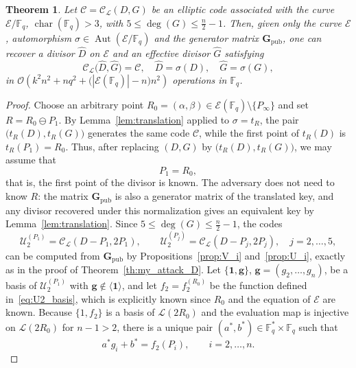 \documentclass[sn-mathphys-num]{sn-jnl_modified}
\newcommand{\FF}{\ensuremath{\mathbb{F}}}
\newtheorem{theorem}{Theorem}[subsection]
\begin{document}
\begin{theorem}\label{th:my_attack_no_hints}
Let $\mathcal{C} = \mathcal{C}_\mathscr{L}(D, G)$ be an elliptic code associated with the curve $\mathcal{E}/\FF_q$, $\operatorname{char}(\FF_q) > 3$, with $5 \leq \deg(G) \leq \frac{n}{2}-1$. Then, given only the curve $\mathcal{E}$, automorphism $\sigma \in \operatorname{Aut}(\mathcal{E}/\FF_q)$ and the generator matrix $\mathbf{G}_{\operatorname{pub}}$, one can recover a divisor $\widehat{D}$ on $\mathcal{E}$ and an effective divisor $\widehat{G}$ satisfying
\[
\mathcal{C}_\mathscr{L}\bigl(\widehat{D}, \widehat{G}\bigr) = \mathcal{C}, \quad
\widehat{D} = \sigma(D), \quad \widehat{G} = \sigma(G),
\]
in $\mathcal{O}\!\left(k^2n^2 + n q^2 + \bigl(|\mathcal{E}(\FF_q)| - n\bigr)n^2\right)$ operations in $\FF_q$. 
\end{theorem}
\begin{proof}
Choose an arbitrary point $R_0 = (\alpha, \beta) \in \mathcal{E}(\FF_q) \setminus \{P_\infty\}$ and set $R = R_0 \ominus P_1$. By Lemma~\ref{lem:translation} applied to $\sigma = t_R$, the pair $\bigl(t_R(D), t_R(G)\bigr)$ generates the same code $\mathcal{C}$, while the first point of $t_R(D)$ is $t_R(P_1) = R_0$. Thus, after replacing $(D,G)$ by $\bigl(t_R(D),t_R(G)\bigr)$, we may assume that
\[
P_1 = R_0,
\]
that is, the first point of the divisor is known. The adversary does not need to know $R$: the matrix $\mathbf{G}_{\operatorname{pub}}$ is also a generator matrix of the translated key, and any divisor recovered under this normalization gives an equivalent key by Lemma~\ref{lem:translation}.
Since $5 \leq \deg(G) \leq \frac{n}{2}-1$, the codes
\[
\mathcal{U}_2^{(P_1)} = \mathcal{C}_\mathscr{L}(D - P_1, 2P_1), \qquad
\mathcal{U}_2^{(P_j)} = \mathcal{C}_\mathscr{L}(D - P_j, 2P_j), \quad j = 2,\dots,5,
\]
can be computed from $\mathbf{G}_{\operatorname{pub}}$ by Propositions~\ref{prop:V_i} and~\ref{prop:U_i}, exactly as in the proof of Theorem~\ref{th:my_attack_D}. Let $\{\mathbf{1},\mathbf{g}\}$, $\mathbf{g} = (g_2,\dots,g_n)$, be a basis of $\mathcal{U}_2^{(P_1)}$ with $\mathbf{g} \notin \langle\mathbf{1}\rangle$, and let $f_2 = f_2^{(R_0)}$ be the function defined in~\eqref{eq:U2_basis}, which is explicitly known since $R_0$ and the equation of $\mathcal{E}$ are known. Because $\{1,f_2\}$ is a basis of $\mathscr{L}(2R_0)$ and the evaluation map is injective on $\mathscr{L}(2R_0)$ for $n-1>2$, there is a unique pair $(a^*,b^*) \in \FF_q^* \times \FF_q$ such that
\begin{equation}\label{eq:true_normalization}
a^* g_i + b^* = f_2(P_i), \qquad i = 2,\dots,n .

\end{equation}
\end{proof}
\end{document}
